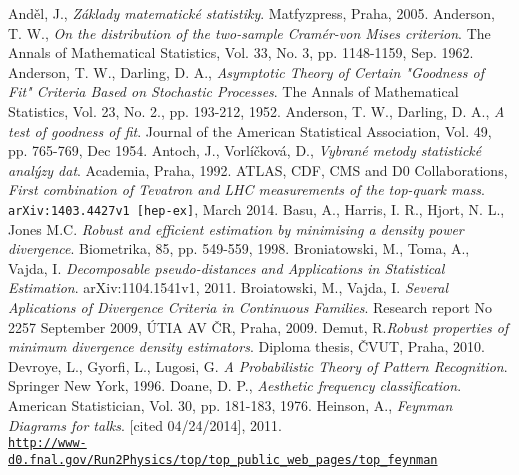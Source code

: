 \begin{thebibliography}{10}

%
And\v{e}l, J., {\em Z\'aklady matematick\'e statistiky}. Matfyzpress, Praha, 2005.
Anderson, T. W., {\em On the distribution of the two-sample Cram\'er-von Mises criterion}. The Annals of Mathematical Statistics, Vol. 33, No. 3, pp. 1148-1159, Sep. 1962.
Anderson, T. W., Darling, D. A., {\em Asymptotic Theory of Certain "Goodness of Fit" Criteria Based on Stochastic Processes}. The Annals of Mathematical Statistics, Vol. 23, No. 2., pp. 193-212, 1952.
Anderson, T. W., Darling, D. A., {\em A test of goodness of fit}. Journal of the American Statistical Association, Vol. 49, pp. 765-769, Dec 1954.
Antoch, J., Vorl\'i\v{c}kov\'a, D., {\em Vybran\'e metody statistick\'e anal\'yzy dat}. Academia, Praha, 1992.
ATLAS, CDF, CMS and D0 Collaborations, {\em First combination of Tevatron and LHC measurements of the top-quark mass}. \texttt{arXiv:1403.4427v1 [hep-ex]}, March 2014.
Basu, A., Harris, I. R., Hjort, N. L., Jones M.C. {\em Robust and efficient estimation by minimising a density power divergence}. Biometrika, 85, pp. 549-559, 1998.
Broniatowski, M., Toma, A., Vajda, I. {\em Decomposable pseudo-distances and Applications in Statistical Estimation}. arXiv:1104.1541v1, 2011.
Broiatowski, M., Vajda, I. {\em Several Aplications of Divergence Criteria in Continuous Families}. Research report No 2257 September 2009, \'{U}TIA AV \v{C}R, Praha, 2009.
Demut, R.{\em Robust properties of minimum divergence density estimators}. Diploma thesis, \v{C}VUT, Praha, 2010.
Devroye, L., Gyorfi, L., Lugosi, G. {\em A Probabilistic Theory of Pattern Recognition}. Springer New York, 1996.
Doane, D. P., {\em Aesthetic frequency classification}. American Statistician, Vol. 30, pp. 181-183, 1976.
Heinson, A., {\em Feynman Diagrams for talks}. [cited 04/24/2014], 2011. \\ \href{http://www-d0.fnal.gov/Run2Physics/top/top_public_web_pages/top_feynman_diagrams.html}{\texttt{http://www-d0.fnal.gov/Run2Physics/top/top\_public\_web\_pages/top\_feynman}} \\

\end{thebibliography}
